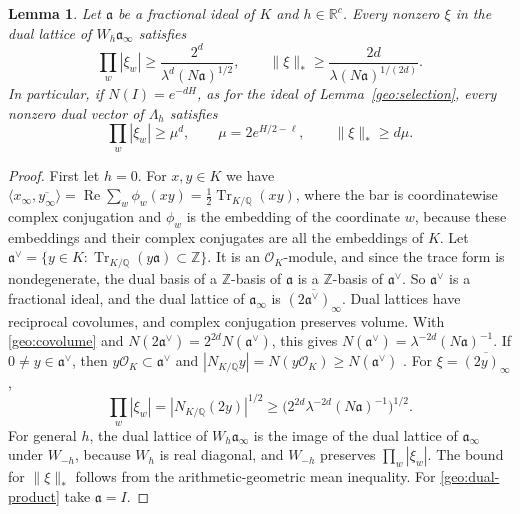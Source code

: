 \documentclass[11pt]{amsart}
\numberwithin{equation}{section}
\newtheorem{lemma}[equation]{Lemma}
\theoremstyle{definition}
\theoremstyle{remark}
\DeclareMathOperator{\Tr}{Tr}
\newcommand{\Q}{\mathbb Q}
\newcommand{\R}{\mathbb R}
\newcommand{\Z}{\mathbb Z}
\begin{document}
\begin{lemma}\label{geo:dual}
Let $\mathfrak a$ be a fractional ideal of $K$ and $h\in\R^c$. Every
nonzero $\xi$ in the dual lattice of $W_h\mathfrak a_\infty$ satisfies
\[
 \prod_w|\xi_w|\ge\frac{2^d}{\lambda^d(N\mathfrak a)^{1/2}},
 \qquad
 \|\xi\|_*\ge\frac{2d}{\lambda(N\mathfrak a)^{1/(2d)}}.
\]
In particular, if $N(I)=e^{-dH}$, as for the ideal of
Lemma~\ref{geo:selection}, every nonzero dual vector of $\Lambda_h$
satisfies
\begin{equation}\label{geo:dual-product}
 \prod_w|\xi_w|\ge\mu^d,\qquad \mu=2e^{H/2-\ell},\qquad
 \|\xi\|_*\ge d\mu.
\end{equation}
\end{lemma}

\begin{proof}
First let $h=0$. For $x,y\in K$ we have
$\langle x_\infty,\overline{y_\infty}\rangle
=\operatorname{Re}\sum_w\phi_w(xy)=\tfrac12\Tr_{K/\Q}(xy)$, where the
bar is coordinatewise complex conjugation and $\phi_w$ is the
embedding of the coordinate $w$, because these embeddings and their
complex conjugates are all the embeddings of $K$. Let
$\mathfrak a^\vee=\{y\in K:\Tr_{K/\Q}(y\mathfrak a)\subset\Z\}$. It is an
$\mathcal O_K$-module, and since the trace form is nondegenerate, the
dual basis of a $\Z$-basis of $\mathfrak a$ is a $\Z$-basis of
$\mathfrak a^\vee$. So $\mathfrak a^\vee$ is a fractional ideal, and
the dual lattice of $\mathfrak a_\infty$ is
$\overline{(2\mathfrak a^\vee)_\infty}$. Dual lattices have reciprocal
covolumes, and complex conjugation preserves volume. With
\eqref{geo:covolume} and $N(2\mathfrak a^\vee)=2^{2d}N(\mathfrak a^\vee)$, this
gives $N(\mathfrak a^\vee)=\lambda^{-2d}(N\mathfrak a)^{-1}$. If
$0\ne y\in\mathfrak a^\vee$, then $y\mathcal O_K\subset\mathfrak a^\vee$
and $|N_{K/\Q}y|=N(y\mathcal O_K)\ge N(\mathfrak a^\vee)$
\cite[Propositions~4.1 and~4.2]{MilneANT}. For
$\xi=\overline{(2y)_\infty}$,
\[
 \prod_w|\xi_w|=|N_{K/\Q}(2y)|^{1/2}
 \ge\bigl(2^{2d}\lambda^{-2d}(N\mathfrak a)^{-1}\bigr)^{1/2}.
\]
For general $h$, the dual lattice of $W_h\mathfrak a_\infty$ is the
image of the dual lattice of $\mathfrak a_\infty$ under $W_{-h}$,
because $W_h$ is real diagonal, and $W_{-h}$ preserves
$\prod_w|\xi_w|$. The bound for $\|\xi\|_*$ follows from the
arithmetic-geometric mean inequality. For \eqref{geo:dual-product} take
$\mathfrak a=I$.
\end{proof}
\end{document}
